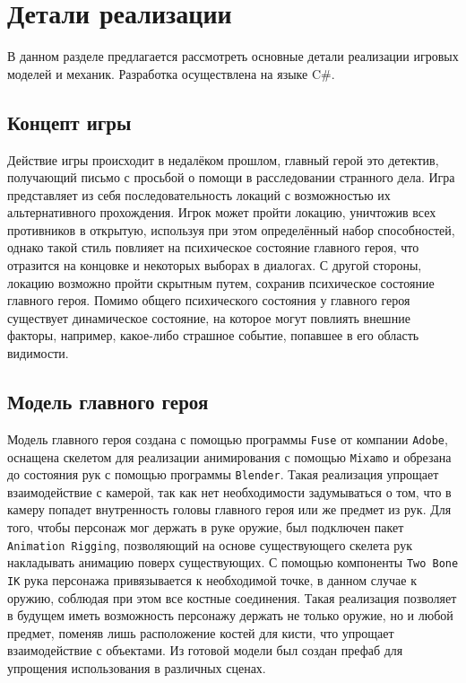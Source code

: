 
\section{Детали реализации}
В данном разделе предлагается рассмотреть основные детали реализации игровых моделей и механик. Разработка осуществлена на языке C\#.

\subsection{Концепт игры}
Действие игры происходит в недалёком прошлом, главный герой это детектив, получающий письмо с просьбой о помощи в расследовании странного дела. Игра представляет из себя последовательность локаций с возможностью их альтернативного прохождения. Игрок может пройти локацию, уничтожив всех противников в открытую, используя при этом определённый набор способностей, однако такой стиль повлияет на психическое состояние главного героя, что отразится на концовке и некоторых выборах в диалогах. С другой стороны, локацию возможно пройти скрытным путем, сохранив психическое состояние главного героя. Помимо общего психического состояния у главного героя существует динамическое состояние, на которое могут повлиять внешние факторы, например, какое-либо страшное событие, попавшее в его область видимости.

\subsection{Модель главного героя}
Модель главного героя создана с помощью программы \texttt{Fuse} от компании \texttt{Adobe}, оснащена скелетом для реализации анимирования с помощью \texttt{Mixamo} и обрезана до состояния рук с помощью программы \texttt{Blender}. Такая реализация упрощает взаимодействие с камерой, так как нет необходимости задумываться о том, что в камеру попадет внутренность головы главного героя или же предмет из рук. Для того, чтобы персонаж мог держать в руке оружие, был подключен пакет \texttt{Animation Rigging}, позволяющий на основе существующего скелета рук накладывать анимацию поверх существующих. С помощью компоненты \texttt{Two Bone IK} рука персонажа привязывается к необходимой точке, в данном случае к оружию, соблюдая при этом все костные соединения. Такая реализация позволяет в будущем иметь возможность персонажу держать не только оружие, но и любой предмет, поменяв лишь расположение костей для кисти, что упрощает взаимодействие с объектами. Из готовой модели был создан префаб для упрощения использования в различных сценах.

